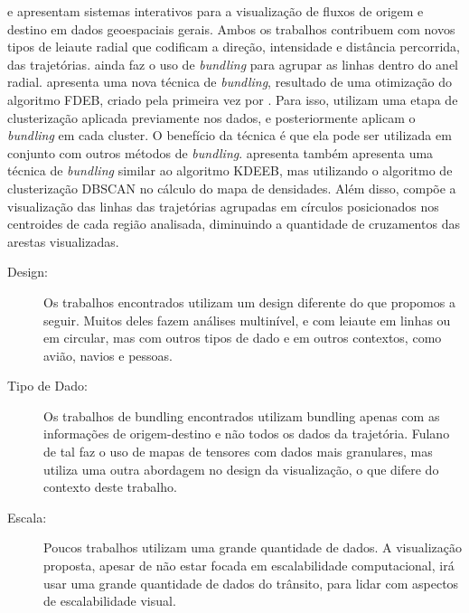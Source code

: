   \citet{Zeng2013} e \citet{Andrienko2017} apresentam sistemas interativos para
a visualização de fluxos de origem e destino em dados geoespaciais gerais.
Ambos os trabalhos contribuem com novos tipos de leiaute radial que codificam a
direção, intensidade e distância percorrida, das trajetórias. \citet{Zeng2013}
ainda faz o uso de \emph{bundling} para agrupar as linhas dentro do anel
radial. \citet{Anita2017} apresenta uma nova técnica de \emph{bundling},
resultado de uma otimização do algoritmo FDEB, criado pela primeira vez por
\citet{Selassie2011}. Para isso, utilizam uma etapa de clusterização aplicada
previamente nos dados, e posteriormente aplicam o \emph{bundling} em cada
cluster. O benefício da técnica é que ela pode ser utilizada em conjunto com
outros métodos de \emph{bundling}. \citet{Landersberg2016} apresenta também
apresenta uma técnica de \emph{bundling} similar ao algoritmo KDEEB, mas utilizando
o algoritmo de clusterização DBSCAN no cálculo do mapa de densidades. Além disso,
compõe a visualização das linhas das trajetórias agrupadas em círculos
posicionados nos centroides de cada região analisada, diminuindo a quantidade
de cruzamentos das arestas visualizadas.  \citet{Klein2013}

\begin{description}
  \item[Design:] Os trabalhos encontrados utilizam um design diferente do que propomos a seguir.
  Muitos deles fazem análises multinível, e com leiaute em linhas ou em circular, mas com outros tipos de dado
  e em outros contextos, como avião, navios e pessoas.

  \item[Tipo de Dado:] Os trabalhos de bundling encontrados utilizam bundling
  apenas com as informações de origem-destino e não todos os dados da trajetória.
  Fulano de tal faz o uso de mapas de tensores com dados mais granulares, mas
  utiliza uma outra abordagem no design da visualização, o que difere do contexto
  deste trabalho.

  \item[Escala:] Poucos trabalhos utilizam uma grande quantidade de dados. A visualização
  proposta, apesar de não estar focada em escalabilidade computacional, irá usar
  uma grande quantidade de dados do trânsito, para lidar com aspectos de escalabilidade
  visual.
\end{description}

